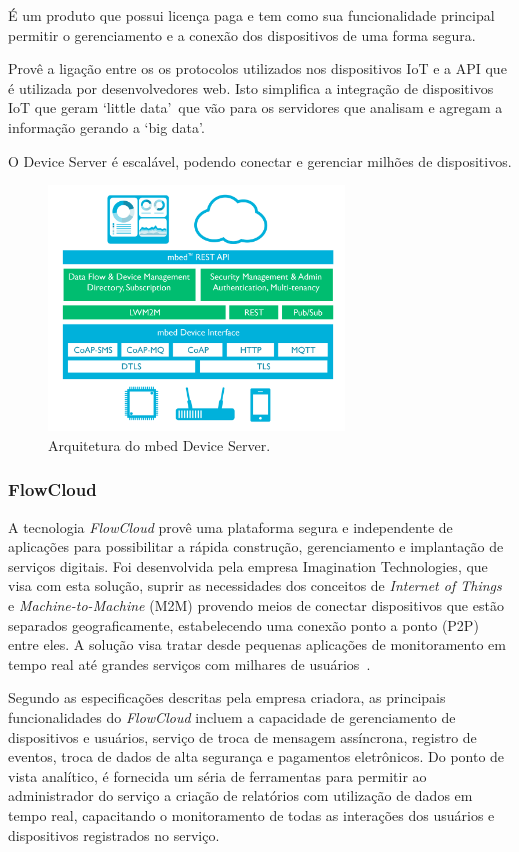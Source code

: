 É um produto que possui licença paga e tem como sua funcionalidade principal permitir o gerenciamento
e a conexão dos dispositivos de uma forma segura.

Provê a ligação entre os os protocolos utilizados nos dispositivos IoT e a API que é utilizada por
desenvolvedores web. Isto simplifica a integração de dispositivos IoT que geram \lq little data\rq\ que vão
para os servidores que analisam e agregam a informação gerando a \lq big data\rq.

O Device Server é escalável, podendo conectar e gerenciar milhões de dispositivos.
\begin{figure}[H]
	\centering
		\includegraphics[width=0.7\textwidth]{fig/mbed_arch.png}
	\caption{Arquitetura do mbed Device Server.}
\end{figure}

\subsubsection{FlowCloud}
A tecnologia \textit{FlowCloud} provê uma plataforma segura e independente de aplicações para possibilitar
a rápida construção, gerenciamento e implantação de serviços digitais. Foi desenvolvida pela empresa
Imagination Technologies, que visa com esta solução, suprir as necessidades dos conceitos de
\textit{Internet of Things} e \textit{Machine-to-Machine} (M2M) provendo meios de conectar dispositivos
que estão separados geograficamente, estabelecendo uma conexão ponto a ponto (P2P) entre eles.
A solução visa tratar desde pequenas aplicações de monitoramento em tempo real até grandes serviços
com milhares de usuários~\cite{flowcloud}.

Segundo as especificações descritas pela empresa criadora, as principais funcionalidades do \textit{FlowCloud}
incluem a capacidade de gerenciamento de dispositivos e usuários, serviço de troca de mensagem assíncrona,
registro de eventos, troca de dados de alta segurança e pagamentos eletrônicos. Do ponto de vista analítico,
é fornecida um séria de ferramentas para permitir ao administrador do serviço a criação de relatórios com
utilização de dados em tempo real, capacitando o monitoramento de todas as interações dos usuários e
dispositivos registrados no serviço.

